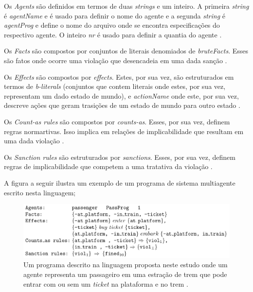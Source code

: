 \documentclass[12pt]{article}
\begin{document}
Os \textit{Agents} são definidos em termos de duas \textit{strings} e um inteiro. A primeira \textit{string} é \textit{agentName} e é usado para definir o nome do agente e a segunda \textit{string} é \textit{agentProg} e define o nome  do arquivo onde se encontra especificações do respectivo agente. O inteiro \textit{nr} é usado para definir a quantia do agente \cite{dastaniNormativeMultiAgentProgram}.

Os \textit{Facts} são compostos por conjuntos de literais denomiados de \textit{bruteFacts}. Esses são fatos onde ocorre uma violação que desencadeia em uma dada sanção \cite{dastaniNormativeMultiAgentProgram}. 

Os \textit{Effects} são compostos por \textit{effects}. Estes, por sua vez, são estruturados em termos de \textit{b-literals} (conjuntos que contem literais onde estes, por sua vez, representam um dado estado de mundo), e \textit{actionName} onde este, por sua vez, descreve ações que geram trasições de um estado de mundo para outro estado \cite{dastaniNormativeMultiAgentProgram}. 

Os \textit{Count-as rules} são compostos por \textit{counts-as}. Esses, por sua vez, definem regras normartivas. Isso implica em relações de implicabilidade que resultam em uma dada violação \cite{dastaniNormativeMultiAgentProgram}. 

Os \textit{Sanction rules} são estruturados por \textit{sanctions}. Esses, por sua vez, definem regras de implicabilidade que competem a uma tratativa da violação \cite{dastaniNormativeMultiAgentProgram}.
 
A figura a seguir ilustra um exemplo de um programa de sistema multiagente escrito nesta linguagem;


\begin{figure}[H]
  \centering
  \includegraphics[width=0.8\linewidth]{programdastani.png} 
  \caption{Um programa descrito na linguagem proposta neste estudo onde um agente representa um passageiro em uma estração de trem que pode entrar com ou sem um \textit{ticket} na plataforma e no trem \cite{dastaniNormativeMultiAgentProgram}.}
  \label{exemploprograma}
\end{figure}





\end{document}
